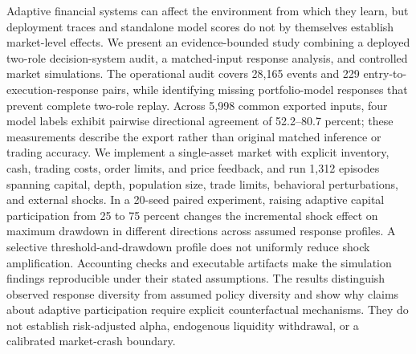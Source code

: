 Adaptive financial systems can affect the environment from which they learn, but deployment traces and standalone model scores do not by themselves establish market-level effects. We present an evidence-bounded study combining a deployed two-role decision-system audit, a matched-input response analysis, and controlled market simulations. The operational audit covers 28,165 events and 229 entry-to-execution-response pairs, while identifying missing portfolio-model responses that prevent complete two-role replay. Across 5,998 common exported inputs, four model labels exhibit pairwise directional agreement of 52.2--80.7 percent; these measurements describe the export rather than original matched inference or trading accuracy. We implement a single-asset market with explicit inventory, cash, trading costs, order limits, and price feedback, and run 1,312 episodes spanning capital, depth, population size, trade limits, behavioral perturbations, and external shocks. In a 20-seed paired experiment, raising adaptive capital participation from 25 to 75 percent changes the incremental shock effect on maximum drawdown in different directions across assumed response profiles. A selective threshold-and-drawdown profile does not uniformly reduce shock amplification. Accounting checks and executable artifacts make the simulation findings reproducible under their stated assumptions. The results distinguish observed response diversity from assumed policy diversity and show why claims about adaptive participation require explicit counterfactual mechanisms. They do not establish risk-adjusted alpha, endogenous liquidity withdrawal, or a calibrated market-crash boundary.